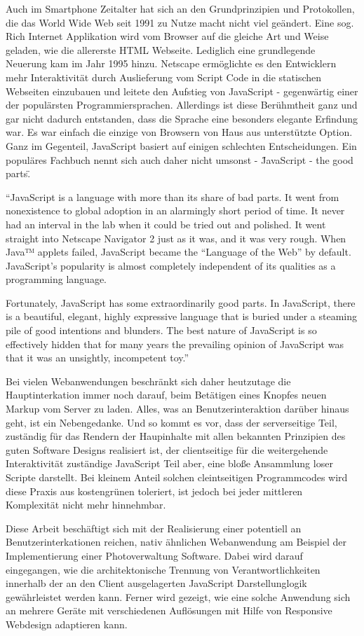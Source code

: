 Auch im Smartphone Zeitalter hat sich an den Grundprinzipien und
Protokollen, die das World Wide Web seit 1991 zu Nutze macht nicht viel geändert.
Eine sog. Rich Internet Applikation wird vom Browser auf die gleiche Art und
Weise geladen, wie die allererste HTML Webseite. Lediglich eine grundlegende
Neuerung kam im Jahr 1995 hinzu. Netscape ermöglichte es den Entwicklern mehr
Interaktivität durch Auslieferung vom Script Code in die statischen Webseiten
einzubauen und leitete den Aufstieg von JavaScript - gegenwärtig einer der populärsten
Programmiersprachen. Allerdings ist diese Berühmtheit ganz und gar nicht
dadurch entstanden, dass die Sprache eine besonders elegante Erfindung war. Es
war einfach die einzige von Browsern von Haus aus unterstützte Option. Ganz
im Gegenteil, JavaScript basiert auf einigen schlechten Entscheidungen. Ein
populäres Fachbuch nennt sich auch daher nicht umsonst - \"JavaScript - the good
parts\".  

``JavaScript is a language with more than its share of bad parts. It went from nonexistence
to global adoption in an alarmingly short period of time. It never had an
interval in the lab when it could be tried out and polished. It went straight into
Netscape Navigator 2 just as it was, and it was very rough. When Java™ applets
failed, JavaScript became the “Language of the Web” by default. JavaScript’s popularity
is almost completely independent of its qualities as a programming language.

Fortunately, JavaScript has some extraordinarily good parts. In JavaScript, there is a
beautiful, elegant, highly expressive language that is buried under a steaming pile of
good intentions and blunders. The best nature of JavaScript is so effectively hidden
that for many years the prevailing opinion of JavaScript was that it was an unsightly,
incompetent toy.''

Bei vielen Webanwendungen beschränkt sich daher heutzutage die Hauptinterkation
immer noch darauf, beim Betätigen eines Knopfes neuen Markup vom Server zu laden. Alles, was an
Benutzerinteraktion darüber hinaus geht, ist ein Nebengedanke. Und so kommt es
vor, dass der serverseitige Teil, zuständig für das Rendern der Haupinhalte mit
allen bekannten Prinzipien des guten Software Designs realisiert ist, der
clientseitige für die weitergehende Interaktivität zuständige JavaScript Teil aber,
eine bloße Ansammlung loser Scripte darstellt. Bei kleinem Anteil solchen
cleintseitigen Programmcodes wird diese Praxis aus kostengrünen toleriert, ist
jedoch bei jeder mittleren Komplexität nicht mehr hinnehmbar.

Diese Arbeit beschäftigt sich mit der Realisierung einer potentiell an
Benutzerinterkationen reichen, nativ ähnlichen Webanwendung am Beispiel der
Implementierung einer Photoverwaltung Software. Dabei wird darauf eingegangen,
wie die architektonische Trennung von Verantwortlichkeiten innerhalb der an den
Client ausgelagerten JavaScript Darstellunglogik gewährleistet werden kann.
Ferner wird gezeigt, wie eine solche Anwendung sich an mehrere Geräte mit verschiedenen
Auflösungen mit Hilfe von Responsive Webdesign adaptieren kann.



